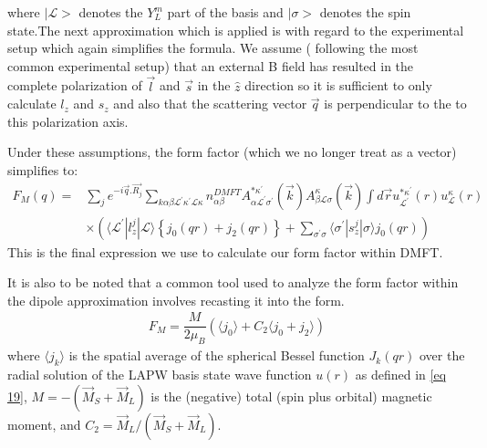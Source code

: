 \documentclass[10pt]{ruthesis}
\begin{document}
{where $|\mathcal{L}>$ denotes the $Y_{L}^{m}$ part of the basis and $|\sigma>$ denotes the spin state.The next approximation which is applied is with regard to the experimental setup which again simplifies the formula. We assume ( following the most common experimental setup) that an external B field has resulted in the complete polarization of $\vec{l}$ and $\vec{s}$ in the $\hat{z}$ direction so it is sufficient to only calculate $l_{z}$ and $s_{z}$ and also that the scattering vector $\vec{q}$ is perpendicular to the to this polarization axis. 

Under these assumptions, the form factor (which we no longer treat as a vector) simplifies to:
\begin{equation} \label{eq 19}
\begin{split}
F_{M}(q)= & \sum_{j} e^{-i\vec{q}.\vec{R_j}}   \sum_{k\alpha \beta \mathcal{L}^{'} \kappa^{'} \mathcal{L}\kappa} n^{DMFT}_{\alpha \beta} A^{* \kappa^{'}}_{\alpha \mathcal{L}^{'} \sigma^{'}}(\vec{k}) A^{ \kappa}_{\beta \mathcal{L}\sigma}(\vec{k}) \int d \vec{r}u_{\mathcal{L^{'}}}^{*\kappa^{'} }(r)u_{\mathcal{L}}^{\kappa}(r) \\
& \times\left( \langle\mathcal{L^{'}}|l_{z}^j|\mathcal{L}\rangle \left\lbrace  j_{0}(qr) +j_{2}(qr) \right \rbrace + \sum_{\sigma^{'} \sigma} \langle \sigma^{'} |s_{z}^j|\sigma \rangle 
 j_0(qr) \right) 
\end{split}
\end{equation}
This is the final expression we use to calculate our form factor within DMFT.

It is also to be noted that a common tool used to analyze the form factor within the dipole approximation involves recasting it into the  form.
\begin{align}
F_{M}=\dfrac{M}{2 \mu_B} \left( \langle j_{0} \rangle + C_{2} \langle j_{0}+j_{2} \rangle \right) 
\end{align} 
where $\langle j_k \rangle$ is the spatial average of the spherical Bessel function
$J_k(qr)$ over the radial solution of the LAPW basis state wave function $u(r)$ as defined in \ref{eq 19},
$M=-(\vec{M}_S + \vec{M}_L)$ is the (negative) total (spin plus orbital) magnetic moment,
and $C_2 = \vec{M}_L/(\vec{M}_S + \vec{M}_L)$.

}
\end{document}

